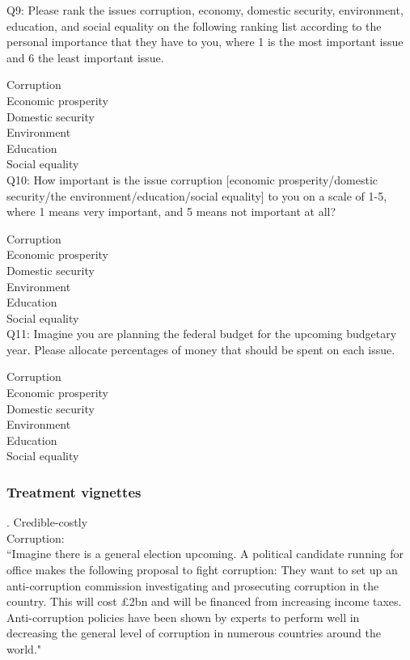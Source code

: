 \documentclass[11pt]{article}
\begin{document}
\noindent Q9: Please rank the issues corruption, economy, domestic security, environment, education, and social equality on the following ranking list according to the personal importance that they have to you, where 1 is the most important issue and 6 the least important issue.

\noindent Corruption\\
Economic prosperity\\
Domestic security\\
Environment\\
Education\\
Social equality\\

\noindent Q10: How important is the issue corruption [economic prosperity/domestic security/the environment/education/social equality] to you on a scale of 1-5, where 1 means very important, and 5 means not important at all?

\noindent Corruption\\
Economic prosperity\\
Domestic security\\
Environment\\
Education\\
Social equality\\

\noindent Q11: Imagine you are planning the federal budget for the upcoming budgetary year. Please allocate percentages of money that should be spent on each issue.

\noindent Corruption\\
Economic prosperity\\
Domestic security\\
Environment\\
Education\\
Social equality\\

\subsubsection{Treatment vignettes}

. Credible-costly\\

Corruption:\\
“Imagine there is a general election upcoming. A political candidate running for office makes the following proposal to fight corruption: They want to set up an anti-corruption commission investigating and prosecuting corruption in the country. This will cost £2bn and will be financed from increasing income taxes. Anti-corruption policies have been shown by experts to perform well in decreasing the general level of corruption in numerous countries around the world."
\end{document}
